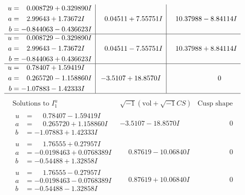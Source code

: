 \documentclass[1p]{elsarticle_modified}
\theoremstyle{definition}
\newcommand{\I}{\sqrt{-1}}
\begin{document}
$$\begin{array}{c|c|c}
\begin{aligned}
u &= \phantom{-}0.008729 + 0.329890 I \\
a &= \phantom{-}2.99643 + 1.73672 I \\
b &= -0.844063 - 0.436623 I\end{aligned}
 & \phantom{-}0.04511 + 7.55751 I & \phantom{-}10.37988 - 8.84114 I \\ \hline\begin{aligned}
u &= \phantom{-}0.008729 - 0.329890 I \\
a &= \phantom{-}2.99643 - 1.73672 I \\
b &= -0.844063 + 0.436623 I\end{aligned}
 & \phantom{-}0.04511 - 7.55751 I & \phantom{-}10.37988 + 8.84114 I \\ \hline\begin{aligned}
u &= \phantom{-}0.78407 + 1.59419 I \\
a &= \phantom{-}0.265720 - 1.158860 I \\
b &= -1.07883 - 1.42333 I\end{aligned}
 & -3.5107 + 18.8570 I & \phantom{-0.000000 } 0\\
 \hline 
 \end{array}$$\newpage$$\begin{array}{c|c|c}  
\text{Solutions to }I^u_{1}& \I (\text{vol} + \sqrt{-1}CS) & \text{Cusp shape}\\
 \hline 
\begin{aligned}
u &= \phantom{-}0.78407 - 1.59419 I \\
a &= \phantom{-}0.265720 + 1.158860 I \\
b &= -1.07883 + 1.42333 I\end{aligned}
 & -3.5107 - 18.8570 I & \phantom{-0.000000 } 0 \\ \hline\begin{aligned}
u &= \phantom{-}1.76555 + 0.27957 I \\
a &= -0.0198463 + 0.0768389 I \\
b &= -0.54488 + 1.32858 I\end{aligned}
 & \phantom{-}0.87619 - 10.06840 I & \phantom{-0.000000 } 0 \\ \hline\begin{aligned}
u &= \phantom{-}1.76555 - 0.27957 I \\
a &= -0.0198463 - 0.0768389 I \\
b &= -0.54488 - 1.32858 I\end{aligned}
 & \phantom{-}0.87619 + 10.06840 I & \phantom{-0.000000 } 0 \\ \hline\begin{aligned}

\end{aligned}
\end{array}$$
\end{document}
